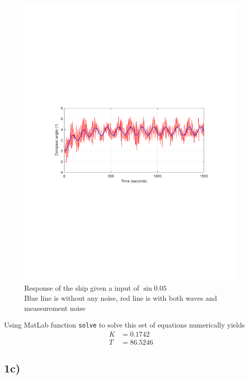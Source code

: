 \begin{figure}
	\centering
	\includegraphics[width=\textwidth]{images/oppg1/sin005.pdf}
	\caption{Response of the ship given a input of $\sin{0.05}$ \\
	Blue line is without any noise, red line is with both waves and meassurement noise}
	\label{fig:sin0.05}
\end{figure}


Using MatLab function \texttt{solve} to solve this set of equations numerically yields
\begin{subequations}
	\begin{align}
		K &= 0.1742 \\
		T &= 86.5246
	\end{align}
\end{subequations}

\subsection{1c)}

